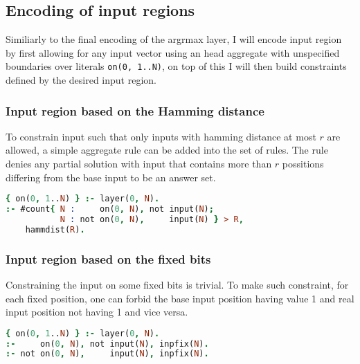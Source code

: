\subsection{Encoding of input regions}

Similiarly to the final encoding of the argrmax layer, I will encode input region
by first allowing for any input vector using an head aggregate with unspecified boundaries
over literals \texttt{on(0, 1..N)}, on top of this I will then build constraints %
defined by the desired input region.

\subsubsection{Input region based on the Hamming distance}

To constrain input such that only inputs with hamming distance at most $r$ are allowed,
a simple aggregate rule can be added into the set of rules.
The rule denies any partial solution with input that contains more than $r$ possitions
differing from the base input to be an answer set.

\begin{code}
\begin{lstlisting}[language=Prolog, numbers=none]
{ on(0, 1..N) } :- layer(0, N).
:- #count{ N :     on(0, N), not input(N);
           N : not on(0, N),     input(N) } > R,
    hammdist(R).
\end{lstlisting}
    \nobreak{}\label{enc:hamming}
\end{code}

\subsubsection{Input region based on the fixed bits}

Constraining the input on some fixed bits is trivial. To make such constraint,
for each fixed position, one can forbid the base input position having value 1
and real input position not having 1 and vice versa.

\begin{code}
\begin{lstlisting}[language=Prolog, numbers=none]
{ on(0, 1..N) } :- layer(0, N).
:-     on(0, N), not input(N), inpfix(N).
:- not on(0, N),     input(N), inpfix(N).
\end{lstlisting}
    \nobreak{}\label{enc:fixed_bits}
\end{code}

